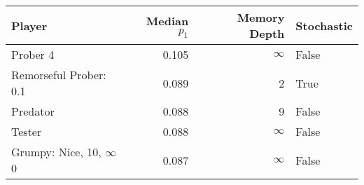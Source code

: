 \begin{tabular}{lrrl}
\toprule
                 Player &  Median $p_1$ &  Memory Depth & Stochastic \\
\midrule
               Prober 4 &         0.105 &            \(\infty\) &      False \\
 Remorseful Prober: 0.1 &         0.089 &             2 &       True \\
               Predator &         0.088 &             9 &      False \\
                 Tester &         0.088 &            \(\infty\) &      False \\
  Grumpy: Nice, 10, \(\infty\)0 &         0.087 &            \(\infty\) &      False \\
\bottomrule
\end{tabular}
